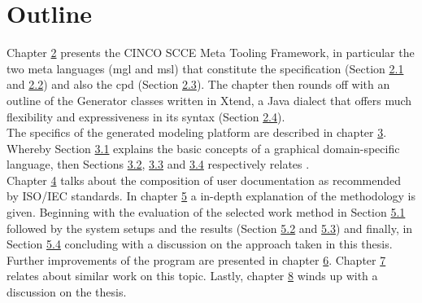 \section{Outline}
Chapter \hyperref[ch:DSL]{2} presents the CINCO SCCE Meta Tooling Framework, in particular the two meta languages (\acrfull{mgl} and \acrfull{msl}) that constitute the specification (Section \hyperref[sec:MGL]{2.1} and \hyperref[sec:MSL]{2.2}) and also the \acrfull{cpd} (Section \hyperref[sec:CPD]{2.3}). The chapter then rounds off with an outline of the Generator classes written in Xtend, a Java dialect that offers much flexibility and expressiveness in its syntax (Section \hyperref[sec:GEN]{2.4}).\\The specifics of the generated modeling platform are described in chapter \hyperref[ch:CP]{3}. Whereby Section \hyperref[sec:gDSL]{3.1} explains the basic concepts of a graphical domain-specific language, then Sections \hyperref[sec:ModElem]{3.2}, \hyperref[sec:FuncElem]{3.3} and \hyperref[sec:ConfElem]{3.4} respectively relates \color{red}{about different modeling elements for configuring and designing the end user documentation}.\color{black}\\Chapter \hyperref[ch:userDoc]{4} talks about the composition of user documentation as recommended by ISO/IEC standards. In chapter \hyperref[ch:eval]{5} a in-depth explanation of the methodology is given. Beginning with the evaluation of the selected work method in Section \hyperref[sec:meth]{5.1} followed by the system setups and the results (Section \hyperref[sec:setup]{5.2} and \hyperref[sec:res]{5.3}) and finally, in Section \hyperref[sec:disc]{5.4} concluding with a discussion on the approach taken in this thesis.\\
Further improvements of the program are presented in chapter \hyperref[ch:futwork]{6}. Chapter \hyperref[ch:relwork]{7} relates about similar work on this topic. Lastly, chapter \hyperref[ch:concl]{8} winds up with a discussion on the thesis.